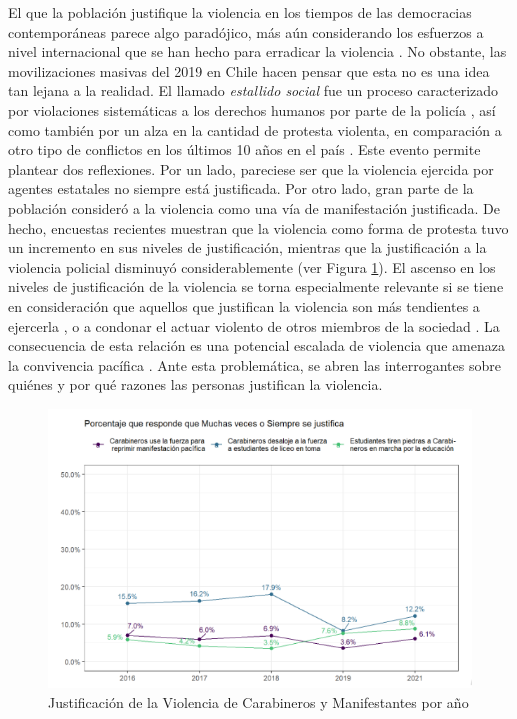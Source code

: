 \documentclass[12pt,twoside]{templates/facsothesis}
\begin{document}
El que la población justifique la violencia en los tiempos de las democracias contemporáneas parece algo paradójico, más aún considerando los esfuerzos a nivel internacional que se han hecho para erradicar la violencia \citep{WHO2014, WHO2010, WHO2009}. No obstante, las movilizaciones masivas del 2019 en Chile hacen pensar que esta no es una idea tan lejana a la realidad. El llamado \emph{estallido social} fue un proceso caracterizado por violaciones sistemáticas a los derechos humanos por parte de la policía \citep{Human2019, ONU2019, Defensoria2020, Amnistia2020}, así como también por un alza en la cantidad de protesta violenta, en comparación a otro tipo de conflictos en los últimos 10 años en el país \citep{Joignant2020}. Este evento permite plantear dos reflexiones. Por un lado, pareciese ser que la violencia ejercida por agentes estatales no siempre está justificada. Por otro lado, gran parte de la población consideró a la violencia como una vía de manifestación justificada. De hecho, encuestas recientes muestran que la violencia como forma de protesta tuvo un incremento en sus niveles de justificación, mientras que la justificación a la violencia policial disminuyó considerablemente \citep{ELSOC2019} (ver Figura \ref{fig:justintro}). El ascenso en los niveles de justificación de la violencia se torna especialmente relevante si se tiene en consideración que aquellos que justifican la violencia son más tendientes a ejercerla \citep{Nunes2021}, o a condonar el actuar violento de otros miembros de la sociedad \citep{Kalmoe2014}. La consecuencia de esta relación es una potencial escalada de violencia que amenaza la convivencia pacífica \citep{Gerber2017}. Ante esta problemática, se abren las interrogantes sobre quiénes y por qué razones las personas justifican la violencia.

\begin{figure}
\includegraphics[width=0.75\linewidth]{images/jvintro} \caption{Justificación de la Violencia de Carabineros y Manifestantes por año}\label{fig:justintro}
\end{figure}
\end{document}
